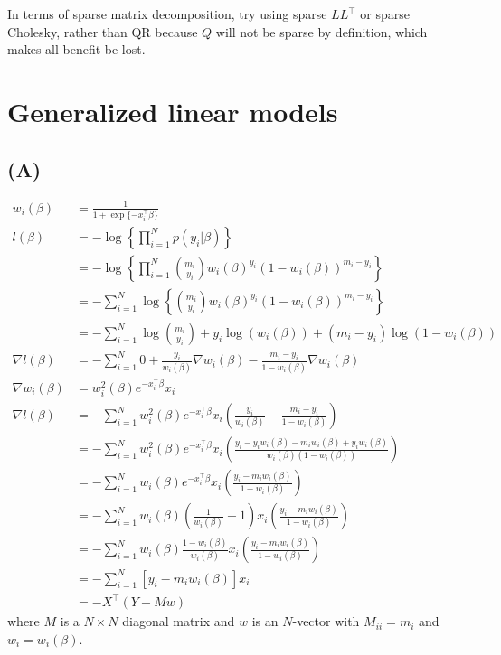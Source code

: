 \documentclass{article}
\begin{document}
In terms of sparse matrix decomposition, try using sparse $LL^\top$ or sparse Cholesky, rather than QR because $Q$ will
not be sparse by definition, which makes all benefit be lost.


\section{Generalized linear models}
\subsection{(A)}
\begin{align*}
w_i(\beta)&=\frac{1}{1+\exp\{-x_i^\top\beta\}}\\
l(\beta)&=-\log\left\{\prod_{i=1}^N p(y_i | \beta)\right\}\\
&=-\log\left\{\prod_{i=1}^N \binom{m_i}{y_i} w_i(\beta)^{y_i} (1-w_i(\beta))^{m_i-y_i}\right\}\\
&=-\sum_{i=1}^N\log\left\{\binom{m_i}{y_i} w_i(\beta)^{y_i} (1-w_i(\beta))^{m_i-y_i}\right\}\\
&=-\sum_{i=1}^N\log\binom{m_i}{y_i} + y_i\log(w_i(\beta)) + (m_i-y_i)\log(1-w_i(\beta))\\
\nabla l(\beta)&=-\sum_{i=1}^N 0 + \frac{y_i}{w_i(\beta)} \nabla w_i(\beta) - \frac{m_i-y_i}{1-w_i(\beta)} \nabla w_i(\beta)\\
\nabla w_i(\beta)&=w_i^2(\beta) e^{-x_i^\top\beta} x_i\\
\nabla l(\beta)&=-\sum_{i=1}^N w_i^2(\beta) e^{-x_i^\top\beta} x_i\left(\frac{y_i}{w_i(\beta)}  - \frac{m_i-y_i}{1-w_i(\beta)}\right)\\
&=-\sum_{i=1}^N w_i^2(\beta) e^{-x_i^\top\beta} x_i\left(\frac{y_i-y_iw_i(\beta) - m_iw_i(\beta) + y_iw_i(\beta)}{w_i(\beta)(1-w_i(\beta))}\right)\\
&=-\sum_{i=1}^N w_i(\beta) e^{-x_i^\top\beta} x_i\left(\frac{y_i- m_iw_i(\beta)}{1-w_i(\beta)}\right)\\
&=-\sum_{i=1}^N w_i(\beta) \left(\frac{1}{w_i(\beta)} - 1\right)x_i\left(\frac{y_i- m_iw_i(\beta)}{1-w_i(\beta)}\right)\\
&=-\sum_{i=1}^N w_i(\beta) \frac{1-w_i(\beta)}{w_i(\beta)}x_i\left(\frac{y_i- m_iw_i(\beta)}{1-w_i(\beta)}\right)\\
&=-\sum_{i=1}^N \left[y_i- m_iw_i(\beta)\right]x_i\\
&=- X^\top(Y - Mw)
\end{align*}
where $M$ is a $N\times N$ diagonal matrix and $w$ is an $N$-vector with $M_{ii}=m_i$ and $w_i = w_i(\beta)$.
\end{document}
